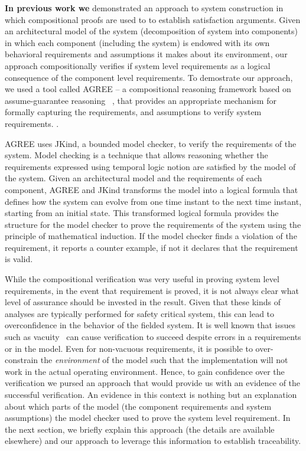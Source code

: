 \textbf{In previous work we} demonstrated an approach to system construction in which compositional proofs are used to to establish satisfaction arguments. Given an architectural model of the system (decomposition of system into components) in which each component (including the system) is endowed with its own behavioral requirements and assumptions it makes about its environment, our approach compositionally verifies if system level requirements as a logical consequence of the component level requirements. To demostrate our approach, we used a tool called AGREE \cite{NFM2012:CoGaMiWhLaLu} -- a compositional reasoning framework based on assume-guarantee reasoning ~\cite{McMillan99:circ}, that provides an appropriate mechanism for formally capturing the requirements, and assumptions to verify system requirements. .

AGREE uses JKind, a bounded model checker, to verify the requirements of the system. Model checking is a technique that allows reasoning whether the requirements expressed using temporal logic notion are satisfied by the model of the system. Given an architectural model and the requirements of each component, AGREE and JKind transforms the model into a logical formula that defines how the system can evolve from one time instant to the next time instant, starting from an initial state. This transformed logical formula provides the structure for the model checker to prove the requirements of the system using the principle of mathematical induction. If the model checker finds a violation of the requirement, it reports a counter example, if not it declares that the requirement is valid.

While the compositional verification was very useful in proving system level requirements, in the event that requirement is proved, it is not always clear what level of assurance should be invested in the result.  Given that these kinds of analyses are typically performed for safety critical system, this can lead to overconfidence in the behavior of the fielded system. It is well known that issues such as vacuity~\cite{Kupferman03:Vacuity} can cause verification to succeed despite errors in a requirements or in the model. Even for non-vacuous requirements, it is possible to over-constrain the {\em environment} of the model such that the implementation will not work in the actual operating environment. Hence, to gain confidence over the verification we pursed an approach that would provide us with an evidence of the successful verification. An evidence in this context is nothing but an explanation about which parts of the model (the component requirements and system assumptions) the model checker used to prove the system level requirement. In the next section, we briefly explain this approach (the details are available elsewhere) and our approach to leverage this information to establish traceability.


